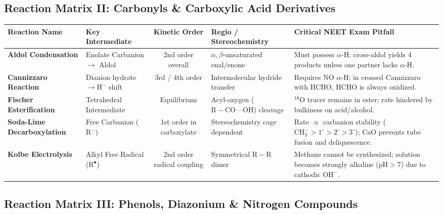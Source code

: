 \documentclass[10pt,twoside,openright]{book}
\begin{document}
\clearpage

\subsection{Reaction Matrix II: Carbonyls \& Carboxylic Acid Derivatives}

\begin{center}
\scriptsize
\renewcommand{\arraystretch}{1.08}
{\scriptsize\setlength{\tabcolsep}{2.0pt}
\begin{tabularx}{\linewidth}{|L|L|c|L|L|}
\hline
\textbf{Reaction Name} & \textbf{Key Intermediate} & \textbf{Kinetic Order} & \textbf{Regio / Stereochemistry} & \textbf{Critical NEET Exam Pitfall} \\
\hline
\textbf{Aldol Condensation} & Enolate Carbanion $\to$ Aldol & 2nd order overall & $\alpha,\beta$-unsaturated enal/enone & Must possess $\alpha$-H; cross-aldol yields 4 products unless one partner lacks $\alpha$-H. \\
\hline
\textbf{Cannizzaro Reaction} & Dianion hydrate $\to \mathrm{H^-}$ shift & 3rd / 4th order & Intermolecular hydride transfer & Requires NO $\alpha$-H; in crossed Cannizzaro with $\mathrm{HCHO}$, $\mathrm{HCHO}$ is always oxidized. \\
\hline
\textbf{Fischer Esterification} & Tetrahedral Intermediate & Equilibrium & Acyl-oxygen ($\mathrm{R-CO\text{---}OH}$) cleavage & $^{18}\mathrm{O}$ tracer remains in ester; rate hindered by bulkiness on acid/alcohol. \\
\hline
\textbf{Soda-Lime Decarboxylation} & Free Carbanion ($\mathrm{R^-}$) & 1st order in carboxylate & Stereochemistry cage dependent & Rate $\propto$ carbanion stability ($\mathrm{CH_3^-} > 1^\circ > 2^\circ > 3^\circ$); $\mathrm{CaO}$ prevents tube fusion and deliquescence. \\
\hline
\textbf{Kolbe Electrolysis} & Alkyl Free Radical ($\mathrm{R^\bullet}$) & 2nd order radical coupling & Symmetrical $\mathrm{R-R}$ dimer & Methane cannot be synthesized; solution becomes strongly alkaline ($\mathrm{pH} > 7$) due to cathodic $\mathrm{OH^-}$. \\
\hline
\end{tabularx}}
\end{center}

\clearpage

\subsection{Reaction Matrix III: Phenols, Diazonium \& Nitrogen Compounds}
\end{document}
